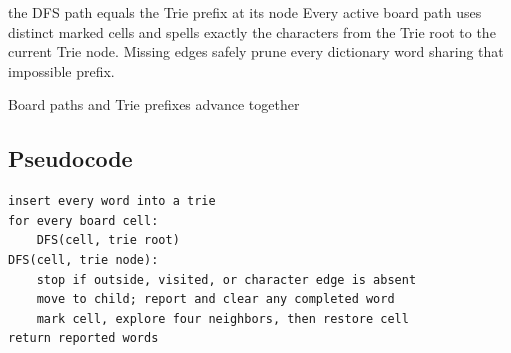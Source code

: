 \begin{invariantbox}{the DFS path equals the Trie prefix at its node}
Every active board path uses distinct marked cells and spells exactly the
characters from the Trie root to the current Trie node. Missing edges safely
prune every dictionary word sharing that impossible prefix.
\end{invariantbox}

\begin{visualbox}{Board paths and Trie prefixes advance together}
\centering
{}
\end{visualbox}

\subsection{Pseudocode}
\begin{lstlisting}[style=pseudocode]
insert every word into a trie
for every board cell:
    DFS(cell, trie root)
DFS(cell, trie node):
    stop if outside, visited, or character edge is absent
    move to child; report and clear any completed word
    mark cell, explore four neighbors, then restore cell
return reported words
\end{lstlisting}

